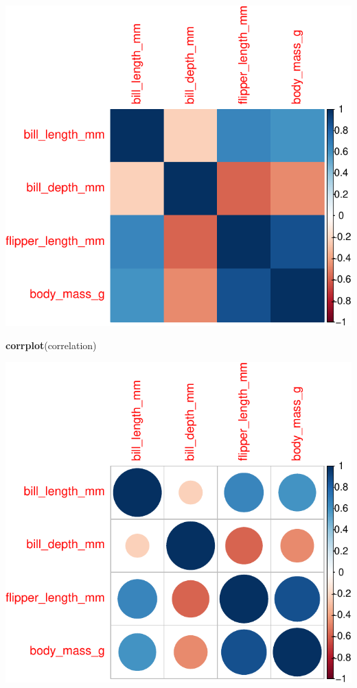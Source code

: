 \documentclass[
]{article}
\newenvironment{Shaded}{\begin{snugshade}}{\end{snugshade}}
\newcommand{\FunctionTok}[1]{\textcolor[rgb]{0.13,0.29,0.53}{\textbf{#1}}}
\newcommand{\NormalTok}[1]{#1}
\begin{document}
\includegraphics{es_files/figure-latex/unnamed-chunk-21-1.pdf}

\begin{Shaded}
\begin{Highlighting}[]
\FunctionTok{corrplot}\NormalTok{(correlation)}
\end{Highlighting}
\end{Shaded}

\includegraphics{es_files/figure-latex/unnamed-chunk-22-1.pdf}
\end{document}
